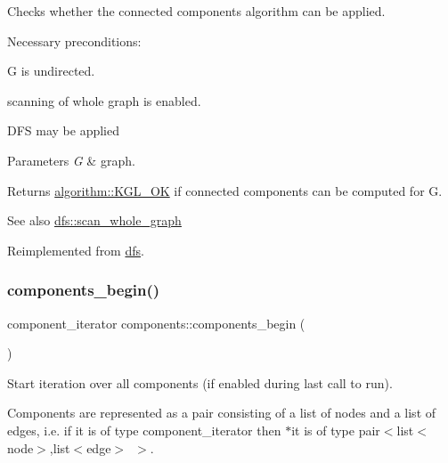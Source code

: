 Checks whether the connected components algorithm can be applied. 

Necessary preconditions\+:
\begin{DoxyItemize}
\item G is undirected.
\item scanning of whole graph is enabled.
\item D\+FS may be applied
\end{DoxyItemize}


\begin{DoxyParams}{Parameters}
{\em G} & graph. \\
\hline
\end{DoxyParams}
\begin{DoxyReturn}{Returns}
\mbox{\hyperlink{classalgorithm_af1a0078e153aa99c24f9bdf0d97f6710aae4c1cd7fe8d8cf4b143241a6e7c31cf}{algorithm\+::\+K\+G\+L\+\_\+\+OK}} if connected components can be computed for G. 
\end{DoxyReturn}
\begin{DoxySeeAlso}{See also}
\mbox{\hyperlink{classdfs_aa7c864a6f3a120720138b187b3ed95b5}{dfs\+::scan\+\_\+whole\+\_\+graph}} 
\end{DoxySeeAlso}


Reimplemented from \mbox{\hyperlink{classdfs_a1af70060897529e67910f589b047e576}{dfs}}.

\mbox{\label{classcomponents_a8a645639044375cdaefabffda3ae70e0}} 
\subsubsection{\texorpdfstring{components\+\_\+begin()}{components\_begin()}}
{\footnotesize\ttfamily component\+\_\+iterator components\+::components\+\_\+begin (\begin{DoxyParamCaption}{ }\end{DoxyParamCaption})\hspace{0.3cm}{\ttfamily [inline]}}



Start iteration over all components (if enabled during last call to run). 

Components are represented as a pair consisting of a list of nodes and a list of edges, i.\+e. if {\ttfamily it} is of type {\ttfamily component\+\_\+iterator} then {\ttfamily $\ast$it} is of type {\ttfamily pair$<$list$<$node$>$},list$<$edge$>$~$>$.

